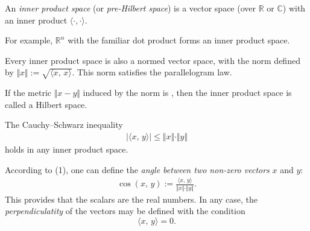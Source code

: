 \documentclass{article}
\def\ip#1{{\langle #1\rangle}}
\begin{document}

An \emph{inner product space} (or \emph{pre-Hilbert space}) is a vector space
(over $\mathbb{R}$ or $\mathbb{C}$)
with an inner product $\ip{\cdot,\cdot}$.

For example, $\mathbb{R}^n$ with the familiar dot product
forms an inner product space.

Every inner product space is also a normed vector space,
with the norm defined by $\Vert x \Vert := \sqrt{\ip{x,\,x}}$.
This norm satisfies the parallelogram law.

If the metric $\Vert{x-y}\Vert$
induced by the norm is ,
then the inner product space is called a Hilbert space.

The Cauchy--Schwarz inequality 
\begin{align}
  |\ip{x,\,y}| \le \Vert x\Vert \cdot\Vert y\Vert
\end{align}
holds in any inner product space.

According to (1), one can define the {\em angle between two non-zero vectors} $x$ and $y$:
\begin{align}
  \cos(x,\,y) := \frac{\ip{x,\,y}}{\Vert{x}\Vert\cdot\Vert{y}\Vert}.
\end{align}
This provides that the scalars are the real numbers.  In any case, the {\em perpendiculatity} of the vectors may be defined with the condition
 $$\ip{x,\,y} =0.$$
\end{document}
